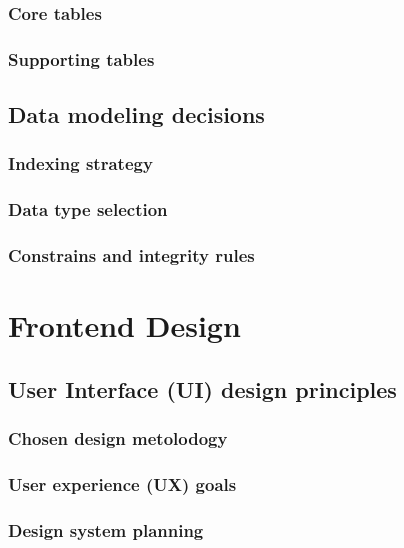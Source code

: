 \subsubsection{Core tables}
    
\subsubsection{Supporting tables}
    
\subsection{Data modeling decisions}

\subsubsection{Indexing strategy}

\subsubsection{Data type selection}

\subsubsection{Constrains and integrity rules}

\section{Frontend Design}

\subsection{User Interface (UI) design principles}

\subsubsection{Chosen design metolodogy}

\subsubsection{User experience (UX) goals}

\subsubsection{Design system planning}

